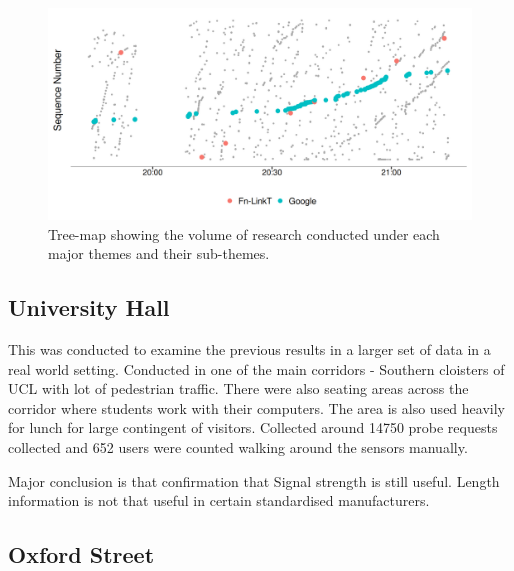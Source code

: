 \begin{figure}
  \includegraphics{images/home-sequence-time.png}
  \caption{Tree-map showing the volume of research conducted under each major themes and their sub-themes.}
  \label{figure:collection:home:sequence}
\end{figure}


\subsection{University Hall}
This was conducted to examine the previous results in a larger set of data in a real world setting.
Conducted in one of the main corridors - Southern cloisters of UCL with lot of pedestrian traffic.
There were also seating areas across the corridor where students work with their computers.
The area is also used heavily for lunch for large contingent of visitors.
Collected around 14750 probe requests collected and 652 users were counted walking around the sensors manually.

Major conclusion is that confirmation that Signal strength is still useful.
Length information is not that useful in certain standardised manufacturers.

\subsection{Oxford Street}

